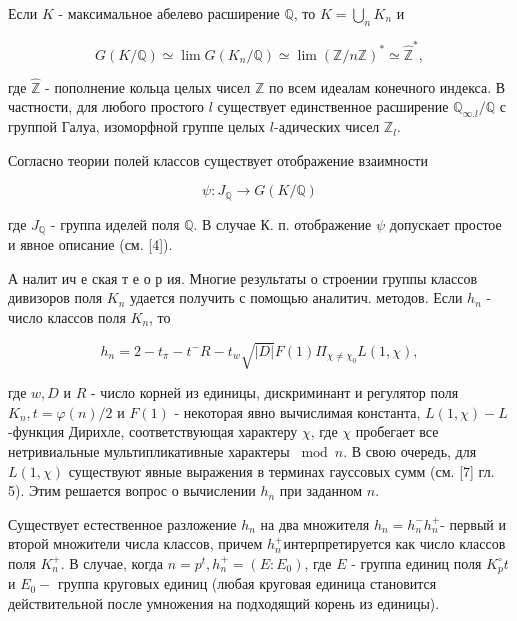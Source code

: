 \documentclass[10pt]{article}
\begin{document}
Если $K$ - максимальное абелево расширение $\mathbb{Q}$, то $K=\bigcup_{n} K_{n}$ и



\[

G(K / \mathbb{Q}) \simeq \lim G\left(K_{n} / \mathbb{Q}\right) \simeq \lim (\mathbb{Z} / n \mathbb{Z})^{*} \simeq \hat{\mathbb{Z}}^{*},

\]



где $\hat{\mathbb{Z}}$ - пополнение кольца целых чисел $\mathbb{Z}$ по всем идеалам конечного индекса. В частности, для любого простого $l$ существует единственное расширение $\mathbb{Q}_{\infty . l} / \mathbb{Q}$ с группой Галуа, изоморфной группе целых $l$-адических чисел $\mathbb{Z}_{l}$.



Согласно теории полей классов существует отображение взаимности



\[

\psi: J_{\mathbb{Q}} \longrightarrow G(K / \mathbb{Q})

\]



где $J_{\mathbb{Q}}$ - группа иделей поля $\mathbb{Q}$. В случае $К$. п. отображение $\psi$ допускает простое и явное описание (см. [4]).



А налит ич е ская т е о р ия. Многие результаты о строении группы классов дивизоров поля $K_{n}$ удается получить с помощью аналитич. методов. Если $h_{n}$ - число классов поля $K_{n}$, то



\[

h_{n}=2-t_{\pi}-t^{-} R-t_{w} \sqrt{|D|} F(1) \Pi_{\chi \neq \chi_{0}} L(1, \chi),

\]



где $w, D$ и $R$ - число корней из единицы, дискриминант и регулятор поля $K_{n}, t=\varphi(n) / 2$ и $F(1)$ - некоторая явно вычислимая константа, $L(1, \chi)-L$-функция Дирихле, соответствующая характеру $\chi$, где $\chi$ пробегает все нетривиальные мультипликативные характеры $\bmod n$. В свою очередь, для $L(1, \chi)$ существуют явные выражения в терминах гауссовых сумм (см. [7] гл. 5). Этим решается вопрос о вычислении $h_{n}$ при заданном $n$.



Существует естественное разложение $h_{n}$ на два множителя $h_{n}=h_{n}^{-} h_{n}^{+}$- первый и второй множители числа классов, причем $h_{n}^{+}$интерпретируется как число классов поля $K_{n}^{+}$. В случае, когда $n=p^{t}, h_{n}^{+}=\left(E: E_{0}\right)$, где $E$ - группа единиц поля $K_{p}^{\circ} t$ и $E_{0}-$ группа круговых единиц (любая круговая единица становится действительной после умножения на подходящий корень из единицы).
\end{document}
